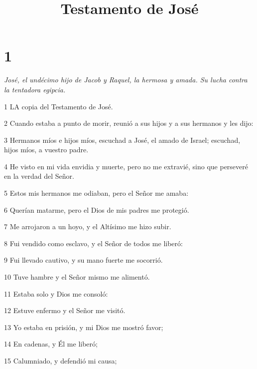 

\title{Testamento de José}

\chapter{1}

\par \textit{José, el undécimo hijo de Jacob y Raquel, la hermosa y amada. Su lucha contra la tentadora egipcia.}

\par 1 LA copia del Testamento de José.

\par 2 Cuando estaba a punto de morir, reunió a sus hijos y a sus hermanos y les dijo:

\par 3 Hermanos míos e hijos míos, escuchad a José, el amado de Israel; escuchad, hijos míos, a vuestro padre.

\par 4 He visto en mi vida envidia y muerte, pero no me extravié, sino que perseveré en la verdad del Señor.

\par 5 Estos mis hermanos me odiaban, pero el Señor me amaba:

\par 6 Querían matarme, pero el Dios de mis padres me protegió.

\par 7 Me arrojaron a un hoyo, y el Altísimo me hizo subir.

\par 8 Fui vendido como esclavo, y el Señor de todos me liberó:

\par 9 Fui llevado cautivo, y su mano fuerte me socorrió.

\par 10 Tuve hambre y el Señor mismo me alimentó.

\par 11 Estaba solo y Dios me consoló:

\par 12 Estuve enfermo y el Señor me visitó.

\par 13 Yo estaba en prisión, y mi Dios me mostró favor;

\par 14 En cadenas, y Él me liberó;

\par 15 Calumniado, y defendió mi causa;

